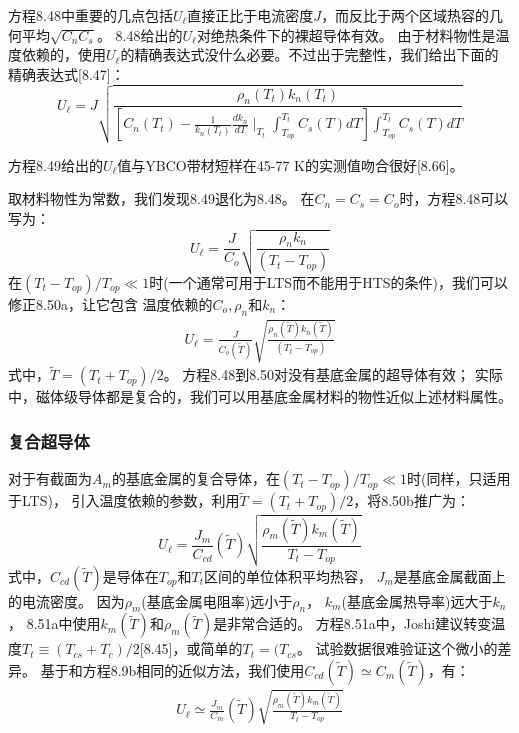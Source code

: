 方程8.48中重要的几点包括$U_\ell$直接正比于电流密度$J$，而反比于两个区域热容的几何平均$\sqrt{C_n C_s}$。
8.48给出的$U_\ell$对绝热条件下的裸超导体有效。
由于材料物性是温度依赖的，使用$U_\ell$的精确表达式没什么必要。不过出于完整性，我们给出下面的精确表达式[8.47]：
\begin{equation}%
U_\ell=J\sqrt{\frac{\rho_n(T_t)k_n(T_t)}{\left[C_n(T_t)-\frac{1}{k_n(T_t)}\frac{dk_n}{dT}\mid_{T_t}\int_{T_{op}}^{T_t}C_s(T)dT\right]\int_{T_{op}}^{T_t}C_s(T)dT}}
\end{equation}

方程8.49给出的$U_\ell$值与YBCO带材短样在45-77 K的实测值吻合很好[8.66]。

取材料物性为常数，我们发现8.49退化为8.48。
在$C_n=C_s=C_o$时，方程8.48可以写为：
\begin{equation}%
U_\ell=\frac{J}{C_o}\sqrt{\frac{\rho_nk_n}{(T_t-T_{op})}}
\end{equation}
在$(T_t-T_{op})/T_{op}\ll 1$时(一个通常可用于LTS而不能用于HTS的条件)，我们可以修正8.50a，让它包含
温度依赖的$C_o,\rho_n$和$k_n$：
\begin{align*}%
U_\ell=\frac{J}{C_o(\tilde{T})}\sqrt{\frac{\rho_n(\tilde{T})k_n(\tilde{T})}{(T_t-T_{op})}} \tag{8.50b}
\end{align*}
式中，$\tilde{T}=(T_t+T_{op})/2$。
方程8.48到8.50对没有基底金属的超导体有效；
实际中，磁体级导体都是复合的，我们可以用基底金属材料的物性近似上述材料属性。

\subsubsection*{复合超导体}
对于有截面为$A_m$的基底金属的复合导体，在$(T_t-T_{op})/T_{op}\ll 1$时(同样，只适用于LTS)，
引入温度依赖的参数，利用$\tilde{T}=(T_t+T_{op})/2$，将8.50b推广为：
\begin{equation}%
U_\ell=\frac{J_m}{C_{cd}}(\tilde{T})\sqrt{\frac{\rho_m(\tilde{T})k_m(\tilde{T})}{T_t-T_{op}}}
\end{equation}
式中，$C_{cd}(\tilde{T})$是导体在$T_{op}$和$T_t$区间的单位体积平均热容，
$J_m$是基底金属截面上的电流密度。
因为$\rho_m$(基底金属电阻率)远小于$\rho_n$，
$k_m$(基底金属热导率)远大于$k_n$，
8.51a中使用$k_m(\tilde{T})$和$\rho_m(\tilde{T})$是非常合适的。
方程8.51a中，Joshi建议转变温度$T_t\equiv (T_{cs}+T_{c})/2$[8.45]，或简单的$T_t= (T_{cs}$。
试验数据很难验证这个微小的差异。
基于和方程8.9b相同的近似方法，我们使用$C_{cd}(\tilde{T})\simeq C_m(\tilde{T})$，有：
\begin{align*}%
U_\ell\simeq\frac{J_m}{C_m}(\tilde{T})\sqrt{\frac{\rho_m(\tilde{T})k_m(\tilde{T})}{T_t-T_{op}}} \tag{8.51b}
\end{align*}


